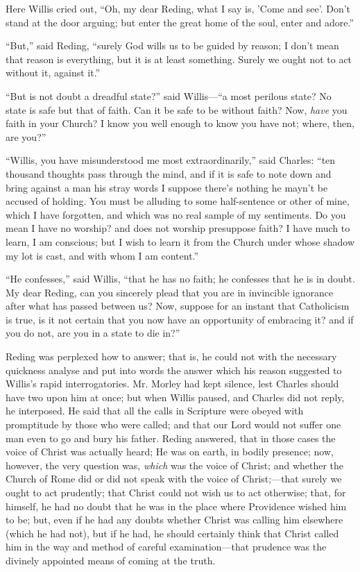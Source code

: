 Here Willis cried out, ``Oh, my dear Reding, what I say is,
'Come and see'. Don't stand at the door arguing; but enter the great
home of the soul, enter and adore.''

``But,'' said Reding, ``surely God wills us to be
guided by reason; I don't mean that reason is everything, but it is at
least something. Surely we ought not to act without it, against
it.''

``But is not doubt a dreadful state?'' said Willis—``a
most perilous state? No state is safe but that of faith. Can it
be safe to be without faith? Now, \emph{have} you faith in your
Church? I know you well enough to know you have not; where, then, are
you?''

``Willis, you have misunderstood me most extraordinarily,''
said Charles: ``ten thousand thoughts pass through the mind, and
if it is safe to note down and bring against a man his stray words I
suppose there's nothing he mayn't be accused of holding. You must be
alluding to some half-sentence or other of mine, which I have
forgotten, and which was no real sample of my sentiments. Do you mean
I have no worship? and does not worship presuppose faith? I have much
to learn, I am conscious; but I wish to learn it from the Church under
whose shadow my lot is cast, and with whom I am content.''

``He confesses,'' said Willis, ``that he has no faith;
he confesses that he is in doubt. My dear Reding, can you sincerely
plead that you are in invincible ignorance after what has passed
between us? Now, suppose for an instant that Catholicism is true, is
it not certain that you now have an opportunity of embracing it? and
if you do not, are you in a state to die in?''

Reding was perplexed how to answer; that is, he could not with the
necessary quickness analyse and put into words the answer which his
reason suggested to Willis's rapid interrogatories. Mr. Morley had
kept silence, lest Charles should have two upon him at once; but when
Willis paused, and Charles did not reply, he interposed. He said that
all the calls in Scripture were obeyed with promptitude by those who
were called; and that our Lord would not suffer one man even to go
and bury his father. Reding answered, that in those cases the
voice of Christ was actually heard; He was on earth, in bodily
presence; now, however, the very question was, \emph{which} was the
voice of Christ; and whether the Church of Rome did or did not speak
with the voice of Christ;—that surely we ought to act prudently;
that Christ could not wish us to act otherwise; that, for himself, he
had no doubt that he was in the place where Providence wished him to
be; but, even if he had any doubts whether Christ was calling him
elsewhere (which he had not), but if he had, he should certainly think
that Christ called him in the way and method of careful examination—that
prudence was the divinely appointed means of coming at the truth.

